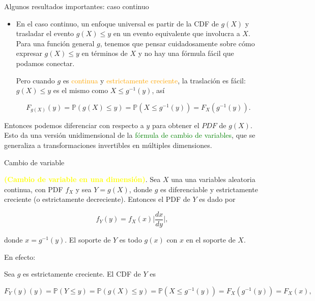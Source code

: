 \documentclass[10pt]{beamer}
\begin{document}
\begin{frame}{Algunos resultados importantes: caso continuo}
\small{
\begin{itemize}
\item  En el caso continuo, un enfoque universal es partir de la CDF de $g(X)$ y trasladar el evento $g(X) \leq y$  en un evento equivalente que involucra a $X$. Para una funci\'on general $g$, tenemos  que pensar cuidadosamente sobre c\'omo expresar $g(X) \leq y$  en t\'erminos de $X$  y no hay una f\'ormula f\'acil que podamos conectar.

Pero cuando $g$ es \textcolor{orange}{continua} y \textcolor{orange}{estrictamente creciente}, la traslaci\'on es f\'acil: $g(X) \leq y$ es el mismo como $X \leq g^{-1}(y)$, as\'i


\[
F_{g(X)}(y) = \mathbb{P}(g(X) \leq y) = \mathbb{P}(X \leq g^{-1}(y)) = F_X(g^{-1}(y)).
\]
\end{itemize}

\vspace{0.2cm}

Entonces podemos diferenciar con respecto a $y$ para obtener el $PDF$ de $g(X)$. Esto da una versi\'on unidimensional de la \textcolor{green}{f\'ormula de cambio de variables}, que se generaliza a transformaciones invertibles en m\'ultiples dimensiones.
}			
\end{frame}

\begin{frame}{Cambio de variable}
\small{\textcolor{yellow}{\textbf{(Cambio de variable en una dimensi\'on)}}. Sea $X$ una una variables aleatoria continua, con PDF $f_X$  y sea $Y = g (X)$, donde $g$ es diferenciable y estrictamente creciente (o estrictamente decreciente). Entonces el PDF de $Y$ es dado por

\[
f_Y(y) = f_X(x)\biggl \vert \frac{dx}{dy}\biggr\vert,  
\]

donde $x = g^{-1}(y)$. El soporte de $Y$ es todo $g(x)$ con $x$ en el soporte de $X$.

\vspace{0.2cm}


En efecto:


Sea $g$ es estrictamente creciente. El CDF de $Y$ es

\[
F_Y(y)(y) = \mathbb{P}(Y \leq y) = \mathbb{P}(g(X) \leq y) = \mathbb{P}(X \leq g^{-1}(y)) = F_X(g^{-1}(y)) = F_X(x),
\]

}

\end{frame}
\end{document}
